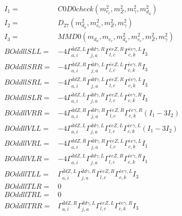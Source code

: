 \documentclass[A4,landscape]{article}
\begin{document}
\begin{align} 
I_1 = & C0D0check(m^2_{e_{{c}}}, m^2_{Z}, m^2_{\gamma}, m^2_{d_{{a}}}) \\ 
I_2 = & D_{27}(m^2_{d_{{a}}}, m^2_{e_{{c}}}, m^2_{Z}, m^2_{\gamma}) \\ 
I_3 = & MMD0(m_{d_{{a}}}, m_{e_{{c}}}, m^2_{d_{{a}}}, m^2_{e_{{c}}}, m^2_{Z}, m^2_{\gamma}) \\ 
  BOddllSLL= & -4  \Gamma^{\bar{d}d Z ,L}_{a, i} \Gamma^{\bar{d}d \gamma ,R}_{j, a} \Gamma^{\bar{e}e Z ,R}_{l, c} \Gamma^{\bar{e}e \gamma ,L}_{c, k} I_3 \\ 
  BOddllSRR= & -4  \Gamma^{\bar{d}d Z ,R}_{a, i} \Gamma^{\bar{d}d \gamma ,L}_{j, a} \Gamma^{\bar{e}e Z ,L}_{l, c} \Gamma^{\bar{e}e \gamma ,R}_{c, k} I_3 \\ 
  BOddllSRL= & -4  \Gamma^{\bar{d}d Z ,R}_{a, i} \Gamma^{\bar{d}d \gamma ,L}_{j, a} \Gamma^{\bar{e}e Z ,R}_{l, c} \Gamma^{\bar{e}e \gamma ,L}_{c, k} I_3 \\ 
  BOddllSLR= & -4  \Gamma^{\bar{d}d Z ,L}_{a, i} \Gamma^{\bar{d}d \gamma ,R}_{j, a} \Gamma^{\bar{e}e Z ,L}_{l, c} \Gamma^{\bar{e}e \gamma ,R}_{c, k} I_3 \\ 
  BOddllVRR= & -4  \Gamma^{\bar{d}d Z ,R}_{a, i} \Gamma^{\bar{d}d \gamma ,R}_{j, a} \Gamma^{\bar{e}e Z ,R}_{l, c} \Gamma^{\bar{e}e \gamma ,R}_{c, k} (I_1 - 3 I_2) \\ 
  BOddllVLL= & -4  \Gamma^{\bar{d}d Z ,L}_{a, i} \Gamma^{\bar{d}d \gamma ,L}_{j, a} \Gamma^{\bar{e}e Z ,L}_{l, c} \Gamma^{\bar{e}e \gamma ,L}_{c, k} (I_1 - 3 I_2) \\ 
  BOddllVRL= & -4  \Gamma^{\bar{d}d Z ,R}_{a, i} \Gamma^{\bar{d}d \gamma ,R}_{j, a} \Gamma^{\bar{e}e Z ,L}_{l, c} \Gamma^{\bar{e}e \gamma ,L}_{c, k} I_1 \\ 
  BOddllVLR= & -4  \Gamma^{\bar{d}d Z ,L}_{a, i} \Gamma^{\bar{d}d \gamma ,L}_{j, a} \Gamma^{\bar{e}e Z ,R}_{l, c} \Gamma^{\bar{e}e \gamma ,R}_{c, k} I_1 \\ 
  BOddllTLL= &  \Gamma^{\bar{d}d Z ,L}_{a, i} \Gamma^{\bar{d}d \gamma ,R}_{j, a} \Gamma^{\bar{e}e Z ,R}_{l, c} \Gamma^{\bar{e}e \gamma ,L}_{c, k} I_3 \\ 
  BOddllTLR= & 0 \\ 
  BOddllTRL= & 0 \\ 
  BOddllTRR= &  \Gamma^{\bar{d}d Z ,R}_{a, i} \Gamma^{\bar{d}d \gamma ,L}_{j, a} \Gamma^{\bar{e}e Z ,L}_{l, c} \Gamma^{\bar{e}e \gamma ,R}_{c, k} I_3 \\ 
\end{align} 
\end{document}
